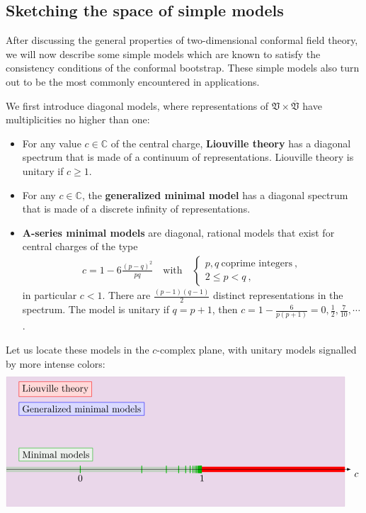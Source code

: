 \documentclass[12pt, a4paper, notitlepage, twoside]{report}
\numberwithin{equation}{section}
\theoremstyle{break}
\begin{document}
\subsection{Sketching the space of simple models \label{secmomo}}

After discussing the general properties of two-dimensional conformal field theory, we will now describe some simple models which are known to satisfy the consistency conditions of the conformal bootstrap.
These simple models also turn out to be the most commonly encountered in applications.  

We first introduce diagonal models, where representations of $\mathfrak{V}\times \overline{\mathfrak{V}}$ have multiplicities no higher than one:
\begin{itemize}
 \item For any value $c\in\mathbb{C}$ of the central charge, \textbf{\boldmath Liouville theory} 
has a diagonal spectrum that is made of a continuum of representations.
Liouville theory is unitary if $c\geq 1$. 
\item For any $c\in\mathbb{C}$, the \textbf{\boldmath generalized minimal model} has a diagonal spectrum that is made of a discrete infinity of representations.
\item \textbf{\boldmath A-series minimal models} are diagonal, rational models that exist for central charges of the type
\begin{align}
 c = 1 - 6 \frac{(p-q)^2}{pq}  \quad \text{with} \quad \left\{\begin{array}{l}  p,q \ \text{coprime  integers}\ , \\ 2\leq p<q\ , \end{array}\right.  
\label{cpq}
\end{align}
in particular $c <1$.
There are $\frac{(p-1)(q-1)}{2}$ distinct representations in the spectrum.
The model is unitary if $q=p+1$, then $c=1-\frac{6}{p(p+1)}=0,\frac12,\frac{7}{10},\cdots$.
\end{itemize}
Let us locate these models in the $c$-complex plane, with unitary models signalled by more intense colors:
\begin{align}
 \begin{tikzpicture}[scale = 4.5, baseline=(current  bounding  box.center)]
 \filldraw [blue!50!red, opacity = .15] (2.15, -.3) -- (2.15, .75) -- (-.6, .75) -- (-.6, -.3) -- cycle;
 \node [draw = red, fill = red!15, right] at (-.5, .65) {Liouville theory};
 \node [draw = blue, fill = blue!15, right] at (-.5, .49) {Generalized minimal models};
 \node[draw = green!70!black, fill = green!16!black!7, right] at (-.5, .12) {Minimal models};
  \filldraw [red] (.98, -.02) -- (.98, .02) -- (2.15, .02) -- (2.15, -.02) -- cycle;
  \filldraw [green!70!black, opacity = .15] (-.6, -.02) -- (-.6, .02) -- (.98, .02) -- (.98, -.02) -- cycle;
 \foreach \p in {2,...,20}
  {
  \draw [green!70!black, thick] ({1-6/(\p*(\p+1))}, -.03) -- ({1-6/(\p*(\p+1))}, .03);
  }
  \node [below] at (0, -.02) {$0$};  \node [below] at (.99, -.02) {$1$};
  \draw[-latex] (-.6, 0) -- (2.2, 0) node [below right] {$c$};
\end{tikzpicture}
\end{align}
\end{document}
